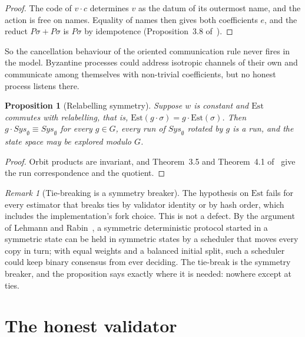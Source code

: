 \documentclass[11pt]{article}
\newtheorem{proposition}[theorem]{Proposition}
\theoremstyle{definition}
\theoremstyle{remark}
\newtheorem{remark}[theorem]{Remark}
\newcommand{\act}[2]{#1\cdot #2}
\newcommand{\scong}{\equiv}
\newcommand{\Est}{\mathrm{Est}}
\begin{document}
\begin{proof}
The code of $\act{v}{c}$ determines $v$ as the datum of its outermost name, and
the action is free on names. Equality of names then gives both coefficients
$e$, and the reduct $P\sigma+P\sigma$ is $P\sigma$ by idempotence
(Proposition~3.8 of~\cite{oriented}).
\end{proof}

So the cancellation behaviour of the oriented communication rule never fires
in the model. Byzantine processes could address isotropic channels of their
own and communicate among themselves with non-trivial coefficients, but no
honest process listens there.

\begin{proposition}[Relabelling symmetry]\label{prop:equiv}
Suppose $w$ is constant and $\Est$ commutes with relabelling, that is,
$\Est(\act{g}{\sigma})=\act{g}{\Est(\sigma)}$. Then
$\act{g}{\mathit{Sys}_\emptyset}\scong\mathit{Sys}_\emptyset$ for every
$g\in G$, every run of $\mathit{Sys}_\emptyset$ rotated by $g$ is a run, and
the state space may be explored modulo $G$.
\end{proposition}

\begin{proof}
Orbit products are invariant, and Theorem~3.5 and Theorem~4.1
of~\cite{oriented} give the run correspondence and the quotient.
\end{proof}

\begin{remark}[Tie-breaking is a symmetry breaker]
The hypothesis on $\Est$ fails for every estimator that breaks ties by
validator identity or by hash order, which includes the implementation's
fork choice. This is not a defect. By the argument of Lehmann and
Rabin~\cite{lehmann-rabin}, a symmetric deterministic protocol started in a
symmetric state can be held in symmetric states by a scheduler that moves every
copy in turn; with equal weights and a balanced initial split, such a scheduler
could keep binary consensus from ever deciding. The tie-break is the symmetry breaker, and the
proposition says exactly where it is needed: nowhere except at ties.
\end{remark}

\section{The honest validator}\label{sec:honest}
\end{document}
